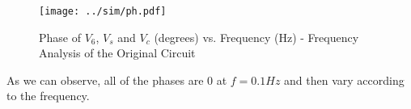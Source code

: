 \begin{figure}[h] \centering
\texttt{[image: ../sim/ph.pdf]}
\caption{Phase of $V_6$, $V_s$ and $V_c$ (degrees) vs. Frequency (Hz) - Frequency Analysis of the Original Circuit}
\label{fig:sim_ph}
\end{figure}


As we can observe, all of the phases are 0 at $f=0.1Hz$ and then vary according to the frequency. 











